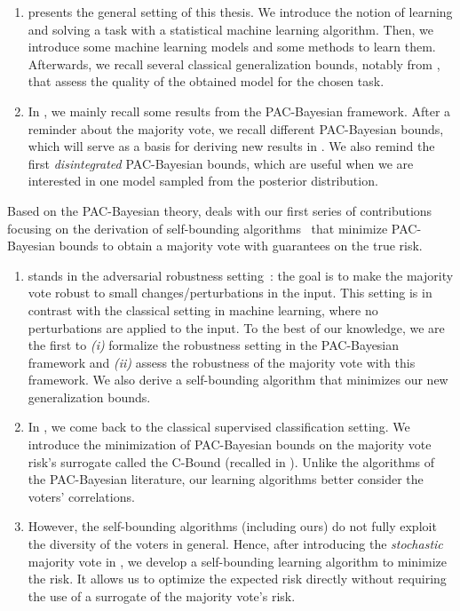 \begin{enumerate}[label={\it (\roman*)}]
    \item {} presents the general setting of this thesis. 
We introduce the notion of learning and solving a task with a statistical machine learning algorithm.
Then, we introduce some machine learning models and some methods to learn them.
Afterwards, we recall several classical generalization bounds, notably from \citet{VapnikChervonenkis1974}, that assess the quality of the obtained model for the chosen task.  

    \item In , we mainly recall some results from the PAC-Bayesian framework.
    After a reminder about the majority vote, we recall different PAC-Bayesian bounds, which will serve as a basis for deriving new results in .
    We also remind the first {\it disintegrated} PAC-Bayesian bounds, which are useful when we are interested in one model sampled from the posterior distribution.
\end{enumerate}

Based on the PAC-Bayesian theory,  deals with our first series of contributions focusing on the derivation of self-bounding algorithms~\citep{Freund1998} that minimize PAC-Bayesian bounds to obtain a majority vote with guarantees on the true risk.

\begin{enumerate}[label={\it (\roman*)}]
    \item {} stands in the adversarial robustness setting~\citep{GoodfellowShlensSzegedy2015}: the goal is to make the majority vote robust to small changes/perturbations in the input.
    This setting is in contrast with the classical setting in machine learning, where no perturbations are applied to the input.
    To the best of our knowledge, we are the first to {\it (i)} formalize the robustness setting in the PAC-Bayesian framework and {\it (ii)} assess the robustness of the majority vote with this framework.
    We also derive a self-bounding algorithm that minimizes our new generalization bounds.
    
    \item  In , we come back to the classical supervised classification setting.
    We introduce the minimization of PAC-Bayesian bounds on the majority vote risk's surrogate called the C-Bound (recalled in ).
    Unlike the algorithms of the PAC-Bayesian literature, our learning algorithms better consider the voters' correlations.

  \item However, the self-bounding algorithms (including ours) do not fully exploit the diversity of the voters in general. 
  Hence, after introducing the {\it stochastic} majority vote in , we develop a self-bounding learning algorithm to minimize the risk.
  It allows us to optimize the expected risk directly without requiring the use of a surrogate of the majority vote's risk.
\end{enumerate}

